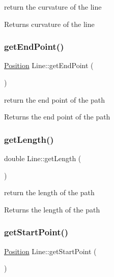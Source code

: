 return the curvature of the line \begin{DoxyReturn}{Returns}
curvature of the line 
\end{DoxyReturn}
\mbox{\label{class_line_a5f22705f0019c1f855f095ea6b7c4b45}} 
\subsubsection{\texorpdfstring{get\+End\+Point()}{getEndPoint()}}
{\footnotesize\ttfamily \mbox{\hyperlink{class_position}{Position}} Line\+::get\+End\+Point (\begin{DoxyParamCaption}{ }\end{DoxyParamCaption})}



return the end point of the path 

\begin{DoxyReturn}{Returns}
the end point of the path 
\end{DoxyReturn}
\mbox{\label{class_line_a9f91895c2a71dcb2c8da5dd5b057b14a}} 
\subsubsection{\texorpdfstring{get\+Length()}{getLength()}}
{\footnotesize\ttfamily double Line\+::get\+Length (\begin{DoxyParamCaption}{ }\end{DoxyParamCaption})}

return the length of the path \begin{DoxyReturn}{Returns}
the length of the path 
\end{DoxyReturn}
\mbox{\label{class_line_aa9924a540d8ba2da841a414c58dafb56}} 
\subsubsection{\texorpdfstring{get\+Start\+Point()}{getStartPoint()}}
{\footnotesize\ttfamily \mbox{\hyperlink{class_position}{Position}} Line\+::get\+Start\+Point (\begin{DoxyParamCaption}{ }\end{DoxyParamCaption})}



